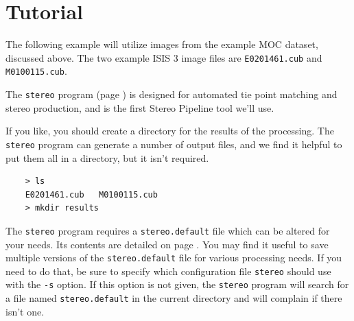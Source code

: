 % 
% 
% 
% 


\section{Tutorial}

The following example will utilize images from the example MOC
dataset, discussed above.  The two example ISIS 3 image files are
\texttt{E0201461.cub} and \texttt{M0100115.cub}.

The \texttt{stereo} program (page \pageref{stereo}) is designed for
automated tie point matching and stereo production, and is the first
Stereo Pipeline tool we'll use.

If you like, you should create a directory for the results of the
processing.  The \texttt{stereo} program can generate a number of
output files, and we find it helpful to put them all in a directory,
but it isn't required.

\begin{verbatim}
    > ls
    E0201461.cub   M0100115.cub
    > mkdir results
\end{verbatim}
\noindent
The \texttt{stereo} program requires a \texttt{stereo.default} file
which can be altered for your needs.  Its contents are detailed on
page \pageref{stereo.default}.  You may find it useful to save
multiple versions of the \texttt{stereo.default} file for various
processing needs. If you need to do that, be sure to specify which
configuration file \texttt{stereo} should use with the \texttt{-s}
option.  If this option is not given, the \texttt{stereo} program
will search for a file named \texttt{stereo.default} in the current
directory and will complain if there isn't one.

